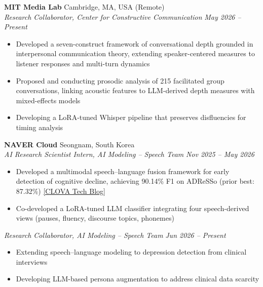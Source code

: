 \documentclass[11pt,a4paper]{article}
\newcommand{\Needspace}[1]{\par\ifdim\dimexpr\pagegoal-\pagetotal\relax<#1\relax\newpage\fi}
\newcommand{\cvrole}[2]{%
    \noindent\textit{#1} \hfill \textit{#2}%
}
\newcommand{\cvresearch}[4]{%
    \Needspace{6\baselineskip}\noindent\textbf{#1} \hfill #2 \\[3pt]
    \cvrole{#3}{#4}%
}
\begin{document}
\cvresearch{MIT Media Lab}{Cambridge, MA, USA (Remote)}{Research Collaborator, Center for Constructive Communication}{May 2026 -- Present}
\begin{itemize}[leftmargin=*, itemsep=3pt, topsep=6pt]
    \item Developed a seven-construct framework of conversational depth grounded in interpersonal communication theory, extending speaker-centered measures to listener responses and multi-turn dynamics
    \item Proposed and conducting prosodic analysis of 215 facilitated group conversations, linking acoustic features to LLM-derived depth measures with mixed-effects models
    \item Developing a LoRA-tuned Whisper pipeline that preserves disfluencies for timing analysis
\end{itemize}
\vspace{10pt}

\begin{minipage}{\textwidth}
\cvresearch{NAVER Cloud}{Seongnam, South Korea}{AI Research Scientist Intern, AI Modeling -- Speech Team}{Nov 2025 -- May 2026}
\end{minipage}\par
\begin{itemize}[leftmargin=*, itemsep=3pt, topsep=6pt]
    \item Developed a multimodal speech--language fusion framework for early detection of cognitive decline, achieving 90.14\% F1 on ADReSSo (prior best: 87.32\%) \href{https://clova.ai/tech-blog/%EB%AA%A9%EC%86%8C%EB%A6%AC%EC%97%90-%EB%8B%B4%EA%B8%B4-%EC%9D%B8%EC%A7%80-%EA%B1%B4%EA%B0%95%EC%9D%98-%EB%8B%A8%EC%84%9C-%EC%B9%98%EB%A7%A4-%EC%A1%B0%EA%B8%B0-%EC%8B%A0%ED%98%B8%EB%A5%BC-%EC%B0%BE}{[CLOVA Tech Blog]}
    \item Co-developed a LoRA-tuned LLM classifier integrating four speech-derived views (pauses, fluency, discourse topics, phonemes)
\end{itemize}
\vspace{6pt}

\begin{minipage}{\textwidth}
\cvrole{Research Collaborator, AI Modeling -- Speech Team}{Jun 2026 -- Present}
\begin{itemize}[leftmargin=*, itemsep=3pt, topsep=6pt]
    \item Extending speech--language modeling to depression detection from clinical interviews
    \item Developing LLM-based persona augmentation to address clinical data scarcity
\end{itemize}
\end{minipage}\par
\vspace{10pt}
\end{document}
